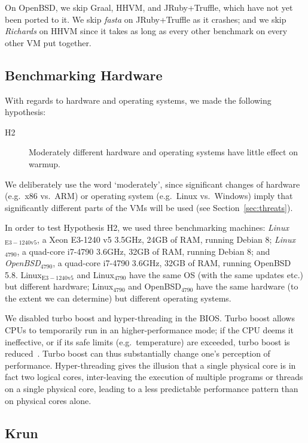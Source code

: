\documentclass[acmlarge]{acmart}\settopmatter{printfolios=true}
\newcommand{\krun}{Krun\xspace}
\newcommand{\hyptwo}{H2\xspace}
\newcommand{\richards}{\emph{Richards}\xspace}
\newcommand{\fasta}{\emph{fasta}\xspace}
\newcommand{\bencherfive}{Linux$_\mathrm{4790}$\xspace}
\newcommand{\benchersix}{OpenBSD$_\mathrm{4790}$\xspace}
\newcommand{\bencherseven}{Linux$_\mathrm{E3-1240v5}$\xspace}
\begin{document}
\label{openbsd porting} On OpenBSD, we skip Graal, HHVM, and JRuby+Truffle, which have not yet been
ported to it. We skip \fasta on JRuby+Truffle as it crashes;
and we skip \richards on HHVM since it takes as long as every other benchmark
on every other VM put together.


\subsection{Benchmarking Hardware}

With regards to hardware and operating systems, we made the
following hypothesis:
\begin{description}
  \item[\hyptwo] Moderately different hardware and operating systems have little effect on warmup.
\end{description}
We deliberately use the word `moderately', since significant changes of hardware
(e.g.~x86 vs.~ARM) or operating system (e.g.~Linux vs.~Windows) imply that
significantly different parts of the VMs will be used (see Section~\ref{sec:threats}).

In order to test Hypothesis H2, we used three benchmarking machines: \emph{\bencherseven}, a Xeon E3-1240 v5 3.5GHz,
24GB of RAM, running Debian 8; \emph{\bencherfive}, a quad-core i7-4790
3.6GHz, 32GB of RAM, running Debian 8; and \emph{\benchersix}, a quad-core i7-4790
3.6GHz, 32GB of RAM, running OpenBSD 5.8. \bencherseven and \bencherfive
have the same OS (with the same updates etc.) but different hardware; \bencherfive
and \benchersix have the same hardware (to the extent we can determine)
but different operating systems.

We disabled turbo boost and hyper-threading in the BIOS. Turbo boost
allows CPUs to temporarily run in an higher-performance
mode; if the CPU deems it ineffective, or if its safe limits (e.g.~temperature) are exceeded,
turbo boost is reduced~\cite{charles09turboboost}. Turbo boost
can thus substantially change one's
perception of performance. Hyper-threading gives the illusion that a single
physical core is in fact two logical cores, inter-leaving the
execution of multiple programs or threads on a single physical core,
leading to a less predictable performance pattern
than on physical cores alone.


\subsection{\krun}
\label{krun}
\end{document}
